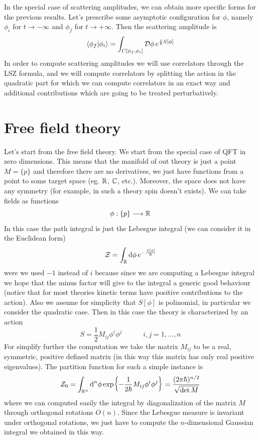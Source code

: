 \documentclass[../main/main.tex]{subfiles}
\begin{document}
In the special case of scattering amplitudes, we can obtain more specific forms for the previous results. Let's prescribe some asymptotic configuration for $\phi$, namely $\phi_i$ for $t\to-\infty$ and $\phi_f$ for $t\to+\infty$. Then the scattering amplitude is
\[\braket{\phi_f}{\phi_i}=\int_{C[\phi_f,\phi_i]}\mathcal D\phi\,e^{\frac i\hbar S[\phi]}\]
In order to compute scattering amplitudes we will use correlators through the LSZ formula, and we will compute correlators by splitting the action in the quadratic part for which we can compute correlators in an exact way and additional contributions which are going to be treated perturbatively. 


\section{Free field theory}

Let's start from the free field theory. We start from the special case of QFT in zero dimensions. This means that the manifold of out theory is just a point $M=\{p\}$ and therefore there are no derivatives, we just have functions from a point to some target space (eg. $\mathbb{R}$, $\mathbb{C}$, etc.). Moreover, the space does not have any symmetry (for example, in such a theory spin doesn't exists). We can take fields as functions
\[\phi:\{p\}\longrightarrow\mathbb{R}\]
In this case the path integral is just the Lebesgue integral (we can consider it in the Euclidean form)
\[\mathcal Z=\int_{\mathbb{R}}\textup{d}\phi\,e^{-\frac{S[\phi]}\hbar}\]
were we used $-1$ instead of $i$ because since we are computing a Lebesgue integral we hope that the minus factor will give to the integral a generic good behaviour (notice that for most theories kinetic terms have positive contributions to the action). Also we assume for simplicity that $S[\phi]$ is polinomial, in particular we consider the quadratic case. 
Then in this case the theory is characterized by an action
\[S=\frac12M_{ij}\phi^i\phi^j\qquad\quad i,j=1,\dots,n\]
For simplify further the computation we take the matrix $M_{ij}$ to be a real, symmetric, positive defined matrix (in this way this matrix has only real positive eigenvalues).
The partition function for such a simple instance is 
\begin{equation}\label{eqn:part-func-free-0D}
\mathcal Z_0=\int_{\mathbb{R}^n}\textup{d}^n\phi \exp{-\frac1{2\hbar}M_{ij}\phi^i\phi^j}=\frac{(2\pi\hbar)^{n/2}}{\sqrt{\det M}}
\end{equation}
where we can computed easily the integral by diagonalization of the matrix $M$ through orthogonal rotations $O(n)$. Since the Lebesgue measure is invariant under orthogonal rotations, we just have to compute the $n$-dimensional Gaussian integral we obtained in this way. 
\end{document}
